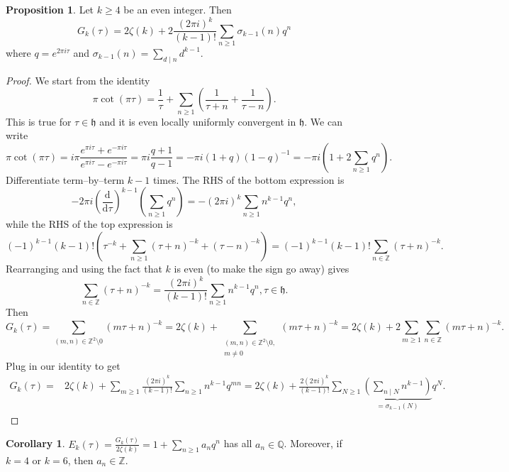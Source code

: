 \documentclass{article}
\theoremstyle{definition}
\newtheorem{cor}[theorem]{Corollary}
\newtheorem{prop}[theorem]{Proposition}
\begin{document}
\begin{prop}
    Let $k\ge 4$ be an even integer. Then $$G_k(\tau) = 2\zeta(k) + 2\frac{(2\pi i)^k}{(k-1)!} \sum_{n\ge 1}^{} \sigma_{k-1}(n)q^n$$
    where $q = e^{2\pi i \tau}$ and $\sigma_{k-1}(n) = \sum_{d \mid n}^{} d^{k-1}$.
\end{prop}
\begin{proof}
    We start from the identity $$\pi \cot (\pi \tau) = \frac{1}{\tau} + \sum_{n\ge 1}^{} \left(\frac{1}{\tau+n} + \frac{1}{\tau-n}\right).$$
    This is true for $\tau \in \mathfrak{h}$ and it is even locally uniformly convergent in $\mathfrak{h}$. We can write \[
    \pi \cot(\pi \tau) = i\pi \frac{e^{\pi i \tau} + e^{-\pi i \tau}}{e^{\pi i \tau}-e^{- \pi i \tau}} = \pi i \frac{q+1}{q-1} = -\pi i (1+q)(1-q)^{-1} = -\pi i \left(1+2\sum_{n\ge 1}^{} q^n\right).
    \]
    Differentiate term--by--term $k-1$ times. The RHS of the bottom expression is \[
    -2\pi i \left(\frac{\mathrm{d}}{\mathrm{d}\tau}\right)^{k-1}\left(\sum_{n\ge 1}^{} q^n \right) = -\left(2\pi i\right)^k \sum_{n\ge 1}^{} n^{k-1}q^n,
    \]
    while the RHS of the top expression is \[
    (-1)^{k-1}(k-1)! \left(\tau^{-k} + \sum_{n\ge 1}^{} (\tau+n)^{-k} + (\tau-n)^{-k} \right) = (-1)^{k-1}(k-1)! \sum_{n \in \mathbb{Z}}^{} (\tau+n)^{-k}.   
    \]
    Rearranging and using the fact that $k$ is even (to make the sign go away) gives \[
    \sum_{n \in \mathbb{Z}}^{} (\tau+n)^{-k} = \frac{(2\pi i)^k}{(k-1)!} \sum_{n\ge 1}^{} n^{k-1}q^n, \tau \in \mathfrak{h}.
    \]
    Then \[
    G_k(\tau) = \sum_{(m,n) \in \mathbb{Z}^2\setminus 0}^{} (m \tau + n)^{-k} = 2 \zeta(k) + \sum_{\substack{(m,n) \in \mathbb{Z}^2\setminus 0, \\m \neq 0}}^{} (m \tau + n)^{-k} = 2 \zeta(k) + 2 \sum_{m\ge 1}^{} \sum_{n \in \mathbb{Z}}^{} (m \tau + n)^{-k}.
    \]
    Plug in our identity to get 
    \begin{align*}
        G_k(\tau) =& 2 \zeta(k) + \sum_{m\ge 1}^{} \frac{(2\pi i )^k}{(k-1)!} \sum_{n\ge 1}^{} n^{k-1}q^{mn} = 2\zeta(k) + \frac{2 (2\pi i)^k}{(k-1)!} \sum_{N\ge 1}^{} \underbrace{\left(\sum_{n \mid N}^{} n^{k-1}\right)}_{=\sigma_{k-1}(N)}q^N.
    \end{align*}
\end{proof}
\begin{cor}
    $E_k(\tau) = \frac{G_k(\tau)}{2\zeta(k)} = 1 + \sum_{n\ge 1}^{} a_nq^n$ has all $a_n \in \mathbb{Q}$. Moreover, if $k=4$ or $k=6$, then $a_n \in \mathbb{Z}$.
\end{cor}
\end{document}
